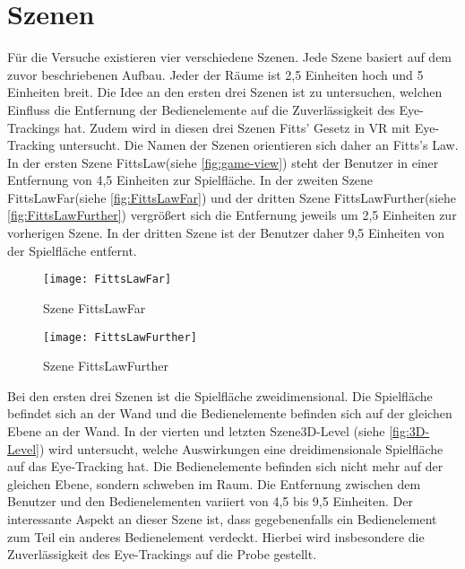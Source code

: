 \section{Szenen}
Für die Versuche existieren vier verschiedene Szenen. Jede Szene basiert auf dem zuvor beschriebenen Aufbau. Jeder der Räume ist 2,5 Einheiten hoch und 5 Einheiten breit. Die Idee an den ersten drei Szenen ist zu untersuchen, welchen Einfluss die Entfernung der Bedienelemente auf die Zuverlässigkeit des Eye-Trackings hat. Zudem wird in diesen drei Szenen Fitts' Gesetz in \ac{VR} mit Eye-Tracking untersucht. Die Namen der Szenen orientieren sich daher an Fitts's Law. In der ersten Szene \glqq FittsLaw\grqq (siehe \autoref{fig:game-view}) steht der Benutzer in einer Entfernung von 4,5 Einheiten zur Spielfläche. In der zweiten Szene \glqq FittsLawFar\grqq (siehe \autoref{fig:FittsLawFar}) und der dritten Szene \glqq FittsLawFurther\grqq (siehe \autoref{fig:FittsLawFurther}) vergrößert sich die Entfernung jeweils um 2,5 Einheiten zur vorherigen Szene. In der dritten Szene ist der Benutzer daher 9,5 Einheiten von der Spielfläche entfernt. 

\begin{figure}[!htbp]
	\centering
	\texttt{[image: FittsLawFar]}
	\caption[Szene FittsLawFar]{Szene FittsLawFar}
	\label{fig:FittsLawFar}
\end{figure}

\begin{figure}[!htbp]
	\centering
	\texttt{[image: FittsLawFurther]}
	\caption[Szene FittsLawFurther]{Szene FittsLawFurther}
	\label{fig:FittsLawFurther}
\end{figure}

Bei den ersten drei Szenen ist die Spielfläche zweidimensional. Die Spielfläche befindet sich an der Wand und die Bedienelemente befinden sich auf der gleichen Ebene an der Wand. In der vierten und letzten Szene\glqq 3D-Level\grqq{} (siehe \autoref{fig:3D-Level}) wird untersucht, welche Auswirkungen eine dreidimensionale Spielfläche auf das Eye-Tracking hat. Die Bedienelemente befinden sich nicht mehr auf der gleichen Ebene, sondern schweben im Raum. Die Entfernung zwischen dem Benutzer und den Bedienelementen variiert von 4,5 bis 9,5 Einheiten. Der interessante Aspekt an dieser Szene ist, dass gegebenenfalls ein Bedienelement zum Teil ein anderes Bedienelement verdeckt. Hierbei wird insbesondere die Zuverlässigkeit des Eye-Trackings auf die Probe gestellt. 

